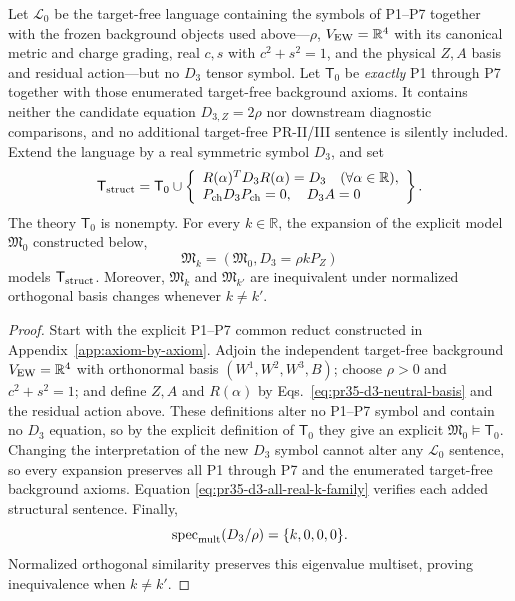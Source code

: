 \begin{theorem}
\label{thm:pr35-d3-common-reduct}
Let $\mathcal L_0$ be the target-free language containing the symbols of P1--P7 together with the frozen background objects used above---$\rho$, $V_{\rm EW}=\mathbb R^4$ with its canonical metric and charge grading, real $c,s$ with $c^2+s^2=1$, and the physical $Z,A$ basis and residual action---but
no $D_3$ tensor symbol.  Let $\mathsf T_0$ be \emph{exactly} P1 through P7 together
with those enumerated target-free background axioms.  It contains neither the candidate equation $D_{3,Z}=2\rho$ nor downstream diagnostic comparisons, and no additional target-free PR-II/III sentence is silently included.  Extend the language by a real symmetric symbol $D_3$, and set
\begin{equation}
 \mathsf T_{\rm struct}=\mathsf T_0\cup
 \left\{\begin{array}{l}
 R(\alpha)^TD_3R(\alpha)=D_3\quad(\forall\alpha\in\mathbb R),\\
 P_{\rm ch}D_3P_{\rm ch}=0,\quad D_3A=0
 \end{array}\right\}.
 \label{eq:pr35-d3-structural-theory}
\end{equation}
The theory $\mathsf T_0$ is nonempty.  For every $k\in\mathbb R$, the
expansion of the explicit model $\mathfrak M_0$ constructed below,
\begin{equation}
 \mathfrak M_k=(\mathfrak M_0,D_3=\rho kP_Z)
 \label{eq:pr35-d3-model-expansion}
\end{equation}
models $\mathsf T_{\rm struct}$.  Moreover, $\mathfrak M_k$ and
$\mathfrak M_{k'}$ are inequivalent under normalized orthogonal basis changes
whenever $k\ne k'$.
\end{theorem}

\begin{proof}
Start with the explicit P1--P7 common reduct constructed in Appendix~\ref{app:axiom-by-axiom}.  Adjoin the independent target-free background $V_{\rm EW}=\mathbb R^4$ with orthonormal basis
$(W^1,W^2,W^3,B)$; choose $\rho>0$ and $c^2+s^2=1$; and define $Z,A$ and $R(\alpha)$ by Eqs.~\eqref{eq:pr35-d3-neutral-basis} and the residual action above.  These definitions alter no P1--P7 symbol and contain no $D_3$ equation, so by the explicit definition of $\mathsf T_0$ they give an
explicit $\mathfrak M_0\models\mathsf T_0$. Changing the interpretation of the new $D_3$ symbol cannot alter any $\mathcal L_0$ sentence, so every expansion preserves all P1 through P7 and
the enumerated target-free background axioms.  Equation \eqref{eq:pr35-d3-all-real-k-family} verifies each added structural sentence. Finally,
\begin{equation}
 \operatorname{spec}_{\rm mult}(D_3/\rho)=\{k,0,0,0\}.
\end{equation}
Normalized orthogonal similarity preserves this eigenvalue multiset, proving inequivalence when $k\ne k'$.
\end{proof}

